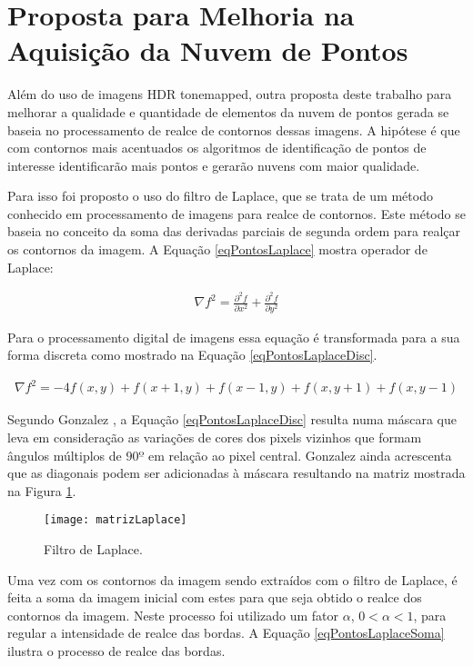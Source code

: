 \section{Proposta para Melhoria na Aquisição da Nuvem de Pontos} \label{pontosProposta}

Além do uso de imagens HDR tonemapped, outra proposta deste trabalho para melhorar a qualidade e quantidade de elementos da nuvem de pontos gerada se baseia no processamento de realce de contornos dessas imagens. A hipótese é que com contornos mais acentuados os algoritmos de identificação de pontos de interesse identificarão mais pontos e gerarão nuvens com maior qualidade.

Para isso foi proposto o uso do filtro de Laplace, que se trata de um método conhecido em processamento de imagens para realce de contornos. Este método se baseia no conceito da soma das derivadas parciais de segunda ordem \cite{gonzalez} para realçar os contornos da imagem. A Equação \ref{eqPontosLaplace} mostra operador de Laplace: \cite{gonzalez}

\begin{align} \label{eqPontosLaplace}
	\nabla f^2 = \frac{\partial^2f}{\partial x^2} + \frac{\partial^2f}{\partial y^2}
\end{align}

Para o processamento digital de imagens essa equação é transformada para a sua forma discreta como mostrado na Equação \ref{eqPontosLaplaceDisc}. \cite{gonzalez}

\begin{align} \label{eqPontosLaplaceDisc}
	\nabla f^2 = -4f(x,y) + f(x+1,y) + f(x-1,y) + f(x,y+1) + f(x,y-1)
\end{align}

Segundo Gonzalez \cite{gonzalez}, a Equação \ref{eqPontosLaplaceDisc} resulta numa máscara que leva em consideração as variações de cores dos pixels vizinhos que formam ângulos múltiplos de $90º$ em relação ao pixel central. Gonzalez \cite{gonzalez} ainda acrescenta que as diagonais podem ser adicionadas à máscara resultando na matriz mostrada na Figura \ref{figPontosLaplaceMat}.

\begin{figure}[H]
  \centering
  \texttt{[image: matrizLaplace]}
  \caption{Filtro de Laplace.}
  \label{figPontosLaplaceMat}
\end{figure}

Uma vez com os contornos da imagem sendo extraídos com o filtro de Laplace, é feita a soma da imagem inicial com estes para que seja obtido o realce dos contornos da imagem. Neste processo foi utilizado um fator $\alpha$, $0 < \alpha < 1$, para regular a intensidade de realce das bordas. A Equação \ref{eqPontosLaplaceSoma} ilustra o processo de realce das bordas.


